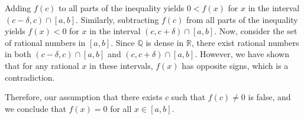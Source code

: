 \documentclass{report}
\begin{document}
Adding $f(c)$ to all parts of the inequality yields $0<f(x)$ for $x$ in the interval $(c-\delta, c) \cap[a, b]$. Similarly, subtracting $f(c)$ from all parts of the inequality yields $f(x)<0$ for $x$ in the interval $(c, c+\delta) \cap[a, b]$. Now, consider the set of rational numbers in $[a, b]$. Since $\mathbb{Q}$ is dense in $\mathbb{R}$, there exist rational numbers in both $(c-\delta, c) \cap[a, b]$ and $(c, c+\delta) \cap[a, b]$. However, we have shown that for any rational $x$ in these intervals, $f(x)$ has opposite signs, which is a contradiction.

Therefore, our assumption that there exists $c$ such that $f(c) \neq 0$ is false, and we conclude that $f(x)=0$ for all $x \in[a, b]$.
\end{document}
